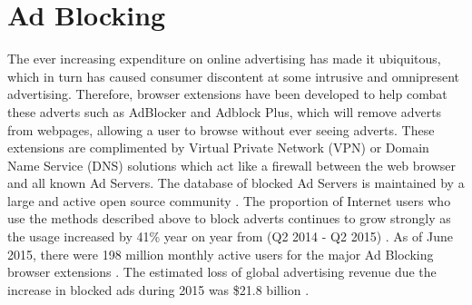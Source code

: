 \documentclass[12pt]{article}
\begin{document}
\pagebreak

\section{Ad Blocking} \label{adBlock}
The ever increasing expenditure on online advertising has made it ubiquitous, which in turn has caused consumer discontent at some intrusive and omnipresent advertising. Therefore, browser extensions have been developed to help combat these adverts such as AdBlocker and Adblock Plus, which will remove adverts from webpages, allowing a user to browse without ever seeing adverts. These extensions are complimented by Virtual Private Network (VPN) or Domain Name Service (DNS) solutions which act like a firewall between the web browser and all known Ad Servers. The database of blocked Ad Servers is maintained by a large and active open source community \parencite{adobeAdBlock}. The proportion of Internet users who use the methods described above to block adverts continues to grow strongly as the usage increased by 41\% year on year from (Q2 2014 - Q2 2015) \parencite{adobeAdBlock}. As of June 2015, there were 198 million monthly active users for the major Ad Blocking browser extensions \parencite{adobeAdBlock}. The estimated loss of global advertising revenue due the increase in blocked ads during 2015 was \$21.8 billion \parencite{adobeAdBlock}. \\
\end{document}
